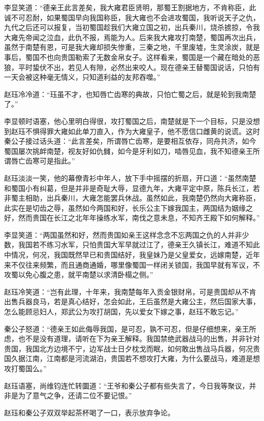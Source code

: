李显笑道：“德亲王此言差矣，我大雍君臣贤明，那蜀王割据地方，不肯称臣，此诚不可忍耐，如果蜀国早向我国称臣，我大雍也不会进攻蜀国，我听说天子之仇，九代之后还可以报复，当初蜀国趁我们大雍立国之初，出兵秦川，烧杀掳掠，令我大雍先帝闻之泣血，此仇不报，焉能为人。后来我大雍攻打南楚，蜀国再次出兵，虽然于南楚有恩，可是我大雍却损失惨重，三秦之地，千里废墟，生灵涂炭，就是事后，蜀国不也向贵国勒索了无数金帛女子。这样看来，蜀国是一个藏在暗处的恶狼，平时蛰伏不出，若见人有隙，必然出来咬人。现在德亲王替蜀国说话，只怕有一天会被这种毫无情义，只知道利益的友邦吞噬。”

赵珏冷冷道：“珏虽不才，也知唇亡齿寒的典故，只怕亡蜀之后，就是轮到我南楚了。”

李显顿时语塞，他心里明白得很，攻打蜀国之后，南楚就是下一个目标，只是没想到赵珏不惧得罪大雍如此单刀直入，作为大雍皇子，他不愿信口雌黄的说谎。这时秦公子接过话头道：“此言差矣，所谓唇亡齿寒，是要相互依存，同舟共济，如今蜀国屡次挑衅南楚，视友好如仇雠，如今是牙利如刀，啮唇见血，我不知德亲王所谓唇亡齿寒可是指此。”

赵珏淡淡一笑，他的幕僚青衫中年人，放下手中摇摆的折扇，开口道：“虽然南楚和蜀国小有纠葛，但是并非是奇耻大辱，显德九年，大雍平定中原，陈兵长江，若非蜀主相助，出兵秦川，大雍怎能罢兵休战。虽然如此，我南楚仍然向大雍称臣，此实在是切齿之辱，虽然如今两国和好，长乐公主下嫁我国主，两国结为姻缘之好，然而贵国在长江之北年年操练水军，南伐之意未息，不知齐王殿下如何解释。”

李显笑道：“两国虽然和好，然而贵国如亲王这样念念不忘两国之仇的人并非少数，我国若不练习水军，只怕贵国大军早就过江了，德亲王久镇长江，难道不知此中情况，何况，我国既然早已和贵国结好，我皇妹乃是父皇爱女，远嫁南楚，近年来不仅往来频繁，而且通商通婚，哪里像蜀国一样闭关锁国，我国早就有军议，不攻蜀以免心腹之患，就平南楚以求清卧榻之侧。”

赵珏冷笑道：“岂有此理，十年来，我南楚每年入贡金银财帛，可是贵国却从不肯出售兵器良马，若是真心结好，怎会如此，王后虽然是大雍公主，然后国家大事，怎么能顾忌妇人，郑武公为攻打胡国，先以爱女下嫁之事，赵珏不敢忘记。”

秦公子怒道：“德亲王如此侮辱我国，是可忍，孰不可忍，但是仔细想来，亲王所虑，也不是没有道理，请听在下为亲王解释。我国禁绝武器战马的出售，并非针对贵国，我国北方边境不宁，边军战士日夕枕戈而眠，如何敢出售战马兵器，何况贵国久据江南，江南都是河流湖泊，贵国若不想攻打大雍，为什么要战马，难道是想攻打蜀国么。”

赵珏语塞，尚维钧连忙转圜道：“王爷和秦公子都有些失言了，今日我等聚议，并非是为了意气之争，还请二位不要记恨。”

赵珏和秦公子双双举起茶杯喝了一口，表示放弃争论。

